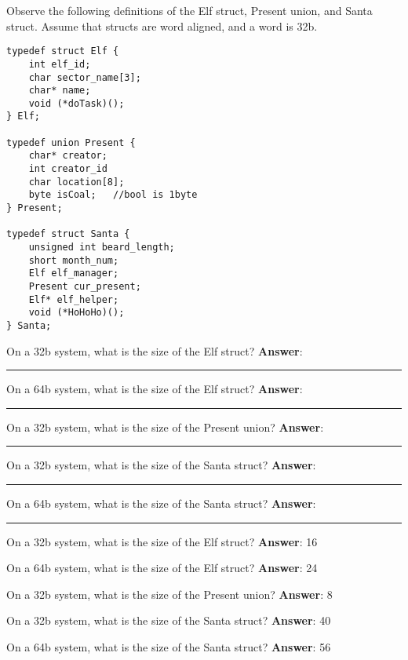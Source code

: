 \begin{blocksection}
Observe the following definitions of the Elf struct, Present union, and Santa struct. Assume that structs are word aligned, and a word is 32b.

\begin{verbatim}
typedef struct Elf {
    int elf_id;
    char sector_name[3];
    char* name;
    void (*doTask)();
} Elf;

typedef union Present {
    char* creator;
    int creator_id
    char location[8];
    byte isCoal;   //bool is 1byte
} Present;

typedef struct Santa {
    unsigned int beard_length;
    short month_num;
    Elf elf_manager;
    Present cur_present;
    Elf* elf_helper;
    void (*HoHoHo)();
} Santa;

\end{verbatim}

\question
On a 32b system, what is the size of the Elf struct? \textbf{Answer}: \rule{1cm}{0.35mm}

\question
On a 64b system, what is the size of the Elf struct? \textbf{Answer}: \rule{1cm}{0.35mm}

\question
On a 32b system, what is the size of the Present union? \textbf{Answer}: \rule{1cm}{0.35mm}

\question
On a 32b system, what is the size of the Santa struct? \textbf{Answer}: \rule{1cm}{0.35mm}

\question
On a 64b system, what is the size of the Santa struct? \textbf{Answer}: \rule{1cm}{0.35mm}

\begin{solution}
\question
On a 32b system, what is the size of the Elf struct? \textbf{Answer}: 16

\question
On a 64b system, what is the size of the Elf struct? \textbf{Answer}: 24

\question
On a 32b system, what is the size of the Present union? \textbf{Answer}: 8

\question
On a 32b system, what is the size of the Santa struct? \textbf{Answer}: 40

\question
On a 64b system, what is the size of the Santa struct? \textbf{Answer}: 56
\end{solution}
\end{blocksection}